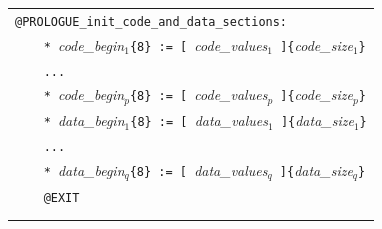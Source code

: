 \documentclass[10pt,twocolumn]{article}
\begin{document}
\begin{table}[!h]
\begin{center}
\def\arraystretch{1}
\begin{tabular}{l}

\texttt{@PROLOGUE\_init\_code\_and\_data\_sections:}\\ %

\texttt{~~~~* }\textit{code\_begin}$ _1 $\texttt{\{8\} :=
[~}\textit{code\_values}$ _1 $\texttt{~]\{}\textit{code\_size}$ _1
$\texttt{\}}\\ %
\texttt{~~~~...}\\ %
\texttt{~~~~* }\textit{code\_begin}$ _p $\texttt{\{8\} :=
[~}\textit{code\_values}$ _p $\texttt{~]\{}\textit{code\_size}$ _p
$\texttt{\}}\\ %

\texttt{~~~~* }\textit{data\_begin}$ _1 $\texttt{\{8\} :=
[~}\textit{data\_values}$ _1 $\texttt{~]\{}\textit{data\_size}$ _1
$\texttt{\}}\\ %
\texttt{~~~~...}\\ %
\texttt{~~~~* }\textit{data\_begin}$ _q $\texttt{\{8\} :=
[~}\textit{data\_values}$ _q $\texttt{~]\{}\textit{data\_size}$ _q
$\texttt{\}}\\ %

\texttt{~~~~@EXIT}\\ %
\\ \\

%
%
%



\end{tabular}
\end{center}
\end{table}
\end{document}
